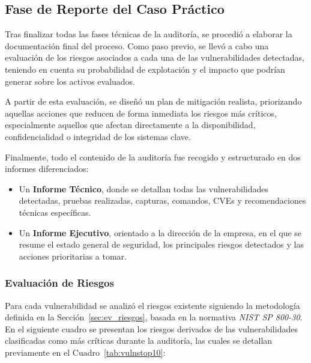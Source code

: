 \documentclass[a4paper, 11pt]{article}
\begin{document}
\subsection{Fase de Reporte del Caso Práctico}

Tras finalizar todas las fases técnicas de la auditoría, se procedió a elaborar la documentación final del proceso. Como paso previo, se llevó a cabo una evaluación de los riesgos asociados a cada una de las vulnerabilidades detectadas, teniendo en cuenta su probabilidad de explotación y el impacto que podrían generar sobre los activos evaluados.

A partir de esta evaluación, se diseñó un plan de mitigación realista, priorizando aquellas acciones que reducen de forma inmediata los riesgos más críticos, especialmente aquellos que afectan directamente a la disponibilidad, confidencialidad o integridad de los sistemas clave.

Finalmente, todo el contenido de la auditoría fue recogido y estructurado en dos informes diferenciados:

\begin{itemize}
    \item Un \textbf{Informe Técnico}, donde se detallan todas las vulnerabilidades detectadas, pruebas realizadas, capturas, comandos, CVEs y recomendaciones técnicas específicas.
    
    \item Un \textbf{Informe Ejecutivo}, orientado a la dirección de la empresa, en el que se resume el estado general de seguridad, los principales riesgos detectados y las acciones prioritarias a tomar.
\end{itemize}


\subsubsection*{Evaluación de Riesgos}

Para cada vulnerabilidad se analizó el riesgos existente siguiendo la metodología definida en la Sección~\ref{sec:ev_riesgos}, basada en la normativa \textit{NIST SP 800-30}. En el siguiente cuadro se presentan los riesgos derivados de las vulnerabilidades clasificadas como más críticas durante la auditoría, las cuales se detallan previamente en el Cuadro~\ref{tab:vulnstop10}:
\end{document}
